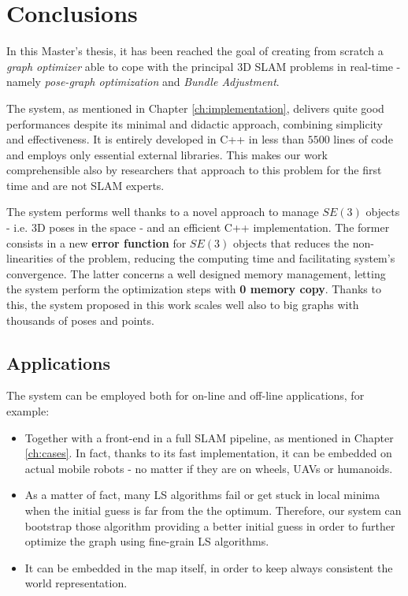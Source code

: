 \chapter{Conclusions}\label{ch:conclusions}
In this Master's thesis, it has been reached the goal of creating from scratch a \textit{graph optimizer} able to cope with the principal 3D SLAM problems in real-time - namely \textit{pose-graph optimization} and \textit{Bundle Adjustment}.

The system, as mentioned in Chapter \ref{ch:implementation}, delivers quite good performances despite its minimal and didactic approach, combining simplicity and effectiveness. It is entirely developed in C++ in less than $5500$ lines of code and employs only essential external libraries. This makes our work comprehensible also by researchers that approach to this problem for the first time and are not SLAM experts.

The system performs well thanks to a novel approach to manage $SE(3)$ objects - i.e. 3D poses in the space - and an efficient C++ implementation. The former consists in a new \textbf{error function} for $SE(3)$ objects that reduces the non-linearities of the problem, reducing the computing time and facilitating system's convergence. The latter concerns a well designed memory management, letting the system perform the optimization steps with \textbf{0 memory copy}. Thanks to this, the system proposed in this work scales well also to big graphs with thousands of poses and points.

\section{Applications}\label{sec:conclusion_application}
The system can be employed both for on-line and off-line applications, for example:

\begin{itemize}
    \item Together with a front-end in a full SLAM pipeline, as mentioned in Chapter \ref{ch:cases}. In fact, thanks to its fast implementation, it can be embedded on actual mobile robots - no matter if they are on wheels, UAVs or humanoids.
    \item As a matter of fact, many LS algorithms fail or get stuck in local minima when the initial guess is far from the the optimum. Therefore, our system can bootstrap those algorithm providing a better initial guess in order to further optimize the graph using fine-grain LS algorithms.
    \item It can be embedded in the map itself, in order to keep always consistent the world representation.
\end{itemize}

